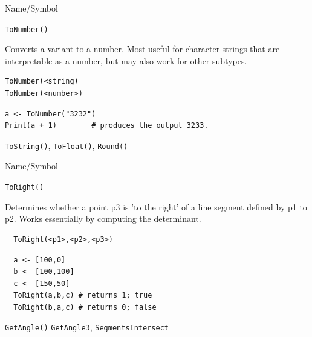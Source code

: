 \begin{desc}{Name/Symbol}
\item[Name/Symbol]  	\verb+ToNumber()+

\item[Description] Converts a variant to a number. Most useful for
  character strings that are interpretable as a number, but may also
  work for other subtypes.

\item[Usage]     
\begin{verbatim}
ToNumber(<string)
ToNumber(<number>)
\end{verbatim}

\item[Example]
\begin{verbatim}
a <- ToNumber("3232")
Print(a + 1)		# produces the output 3233. 
\end{verbatim}

\item[See Also]     	\verb+ToString()+, \verb+ToFloat()+, \verb+Round()+
\end{desc}




\begin{desc}{Name/Symbol}
\item[Name/Symbol]  	\verb+ToRight()+
              
\item[Description]  	Determines whether a point p3 is 'to the right'
  of a line segment defined by p1  to p2.  Works essentially by
  computing the determinant.

\item[Usage]
\begin{verbatim}
  ToRight(<p1>,<p2>,<p3>)
\end{verbatim}

\item[Example]
\begin{verbatim}
  a <- [100,0]
  b <- [100,100]
  c <- [150,50]
  ToRight(a,b,c) # returns 1; true
  ToRight(b,a,c) # returns 0; false

\end{verbatim}

\item[See Also]  
\verb+GetAngle()+ \verb+GetAngle3+, \verb+SegmentsIntersect+
\end{desc}






